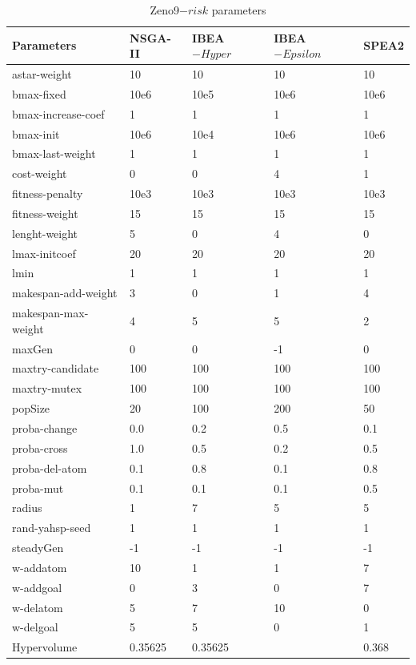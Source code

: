 \documentclass[a4paper,10pt]{article}
\begin{document}
\begin{table}[h]	
\scriptsize										
\begin{tabular}{|l|l|l|l|l|}	
\hline										
Parameters & NSGA-II &  IBEA$-{Hyper}$ &  IBEA$-{Epsilon}$ & SPEA2\\	
\hline	
astar-weight	&	10	&	10	&	10	&	10	\\
bmax-fixed	&	10e6	&	10e5	&	10e6	&	10e6	\\
bmax-increase-coef	&	1	&	1	&	1	&	1	\\
bmax-init	&	10e6	&	10e4	&	10e6	&	10e6	\\
bmax-last-weight	&	1	&	1	&	1	&	1	\\
cost-weight	&	0	&	0	&	4	&	1	\\
fitness-penalty	&	10e3	&	10e3	&	10e3	&	10e3	\\
fitness-weight	&	15	&	15	&	15	&	15	\\
lenght-weight	&	5	&	0	&	4	&	0	\\
lmax-initcoef	&	20	&	20	&	20	&	20	\\
lmin	&	1	&	1	&	1	&	1	\\
makespan-add-weight	&	3	&	0	&	1	&	4	\\
makespan-max-weight	&	4	&	5	&	5	&	2	\\
maxGen	&	0	&	0	&	-1	&	0	\\
maxtry-candidate	&	100	&	100	&	100	&	100	\\
maxtry-mutex	&	100	&	100	&	100	&	100	\\
popSize	&	20	&	100	&	200	&	50	\\
proba-change	&	0.0	&	0.2	&	0.5	&	0.1	\\
proba-cross	&	1.0	&	0.5	&	0.2	&	0.5	\\
proba-del-atom	&	0.1	&	0.8	&	0.1	&	0.8	\\
proba-mut	&	0.1	&	0.1	&	0.1	&	0.5	\\
radius	&	1	&	7	&	5	&	5	\\
rand-yahsp-seed	&	1	&	1	&	1	&	1	\\
steadyGen	&	-1	&	-1	&	-1	&	-1	\\
w-addatom	&	10	&	1	&	1	&	7	\\
w-addgoal	&	0	&	3	&	0	&	7	\\
w-delatom	&	5	&	7	&	10	&	0	\\
w-delgoal	&	5	&	5	&	0	&	1	\\
\hline																		
Hypervolume	&	 0.35625	&	0.35625	&		&	0.368	\\
\hline

\end{tabular}
\caption{Zeno9$-{risk}$ parameters}
\label{tab:zeno9_risktParam}
\end{table}
\end{document}

